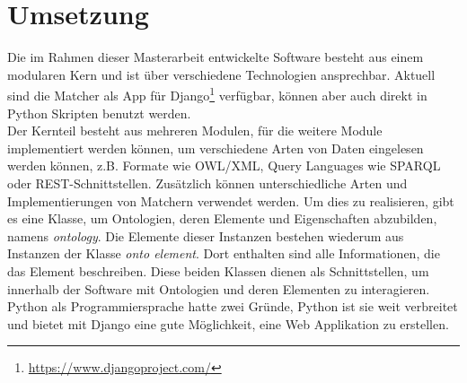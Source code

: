 %
\chapter{Umsetzung}
\label{chap:implementation}
		
		Die im Rahmen dieser Masterarbeit entwickelte Software besteht aus einem
		modularen Kern und ist über verschiedene Technologien ansprechbar. Aktuell
		sind die Matcher als App
		für Django\footnote{\url{https://www.djangoproject.com/}} verfügbar, können
		aber auch direkt in Python Skripten benutzt werden.\\
		Der Kernteil besteht aus mehreren Modulen, für die weitere Module
		implementiert werden können, um verschiedene Arten von Daten eingelesen
		werden können, z.B.
		Formate wie OWL/XML, Query Languages wie SPARQL oder REST-Schnittstellen.
		Zusätzlich können unterschiedliche Arten und Implementierungen von Matchern
		verwendet werden. Um dies zu realisieren, gibt es eine Klasse, um Ontologien,
		deren Elemente und Eigenschaften abzubilden, namens \textit{ontology}.
		Die Elemente dieser Instanzen bestehen wiederum aus Instanzen der Klasse
		\textit{onto element}. Dort enthalten sind alle Informationen, die das Element
		beschreiben. Diese beiden Klassen dienen als Schnittstellen, um innerhalb der
		Software mit Ontologien und deren Elementen zu interagieren.\\
		Python als Programmiersprache hatte zwei Gründe, Python ist sie weit
		verbreitet und bietet mit Django eine gute Möglichkeit, eine Web Applikation
		zu erstellen.
		
